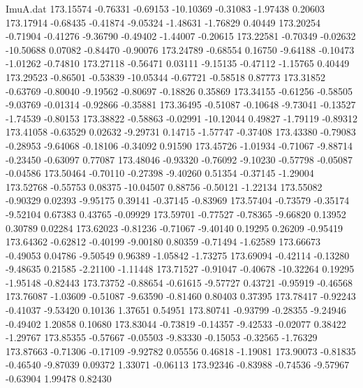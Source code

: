 \begin{filecontents}{ImuA.dat}
 173.15574   -0.76331   -0.69153  -10.10369   -0.31083   -1.97438    0.20603
 173.17914   -0.68435   -0.41874   -9.05324   -1.48631   -1.76829    0.40449
 173.20254   -0.71904   -0.41276   -9.36790   -0.49402   -1.44007   -0.20615
 173.22581   -0.70349   -0.02632  -10.50688    0.07082   -0.84470   -0.90076
 173.24789   -0.68554    0.16750   -9.64188   -0.10473   -1.01262   -0.74810
 173.27118   -0.56471    0.03111   -9.15135   -0.47112   -1.15765    0.40449
 173.29523   -0.86501   -0.53839  -10.05344   -0.67721   -0.58518    0.87773
 173.31852   -0.63769   -0.80040   -9.19562   -0.80697   -0.18826    0.35869
 173.34155   -0.61256   -0.58505   -9.03769   -0.01314   -0.92866   -0.35881
 173.36495   -0.51087   -0.10648   -9.73041   -0.13527   -1.74539   -0.80153
 173.38822   -0.58863   -0.02991  -10.12044    0.49827   -1.79119   -0.89312
 173.41058   -0.63529    0.02632   -9.29731    0.14715   -1.57747   -0.37408
 173.43380   -0.79083   -0.28953   -9.64068   -0.18106   -0.34092    0.91590
 173.45726   -1.01934   -0.71067   -9.88714   -0.23450   -0.63097    0.77087
 173.48046   -0.93320   -0.76092   -9.10230   -0.57798   -0.05087   -0.04586
 173.50464   -0.70110   -0.27398   -9.40260    0.51354   -0.37145   -1.29004
 173.52768   -0.55753    0.08375  -10.04507    0.88756   -0.50121   -1.22134
 173.55082   -0.90329    0.02393   -9.95175    0.39141   -0.37145   -0.83969
 173.57404   -0.73579   -0.35174   -9.52104    0.67383    0.43765   -0.09929
 173.59701   -0.77527   -0.78365   -9.66820    0.13952    0.30789    0.02284
 173.62023   -0.81236   -0.71067   -9.40140    0.19295    0.26209   -0.95419
 173.64362   -0.62812   -0.40199   -9.00180    0.80359   -0.71494   -1.62589
 173.66673   -0.49053    0.04786   -9.50549    0.96389   -1.05842   -1.73275
 173.69094   -0.42114   -0.13280   -9.48635    0.21585   -2.21100   -1.11448
 173.71527   -0.91047   -0.40678  -10.32264    0.19295   -1.95148   -0.82443
 173.73752   -0.88654   -0.61615   -9.57727    0.43721   -0.95919   -0.46568
 173.76087   -1.03609   -0.51087   -9.63590   -0.81460    0.80403    0.37395
 173.78417   -0.92243   -0.41037   -9.53420    0.10136    1.37651    0.54951
 173.80741   -0.93799   -0.28355   -9.24946   -0.49402    1.20858    0.10680
 173.83044   -0.73819   -0.14357   -9.42533   -0.02077    0.38422   -1.29767
 173.85355   -0.57667   -0.05503   -9.83330   -0.15053   -0.32565   -1.76329
 173.87663   -0.71306   -0.17109   -9.92782    0.05556    0.46818   -1.19081
 173.90073   -0.81835   -0.46540   -9.87039    0.09372    1.33071   -0.06113
 173.92346   -0.83988   -0.74536   -9.57967   -0.63904    1.99478    0.82430

\end{filecontents}
